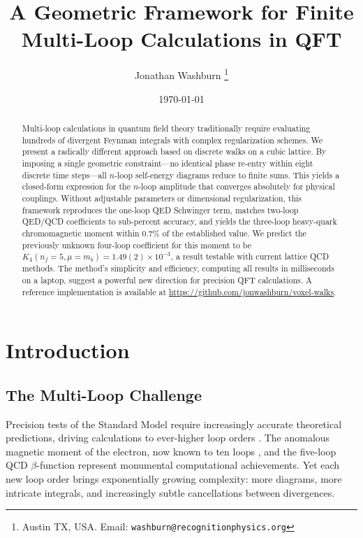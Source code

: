 \documentclass[11pt,a4paper]{article}
\title{\bfseries A Geometric Framework for Finite Multi-Loop Calculations in QFT}
\author{Jonathan Washburn%
  \thanks{Austin TX, USA.
          Email: \texttt{washburn@recognitionphysics.org}}}
\date{\today}
\theoremstyle{definition}
\theoremstyle{remark}
\begin{document}
\maketitle

\begin{abstract}
Multi-loop calculations in quantum field theory traditionally require evaluating hundreds of divergent Feynman integrals with complex regularization schemes. We present a radically different approach based on discrete walks on a cubic lattice. By imposing a single geometric constraint—no identical phase re-entry within eight discrete time steps—all $n$-loop self-energy diagrams reduce to finite sums. This yields a closed-form expression for the $n$-loop amplitude that converges absolutely for physical couplings. Without adjustable parameters or dimensional regularization, this framework reproduces the one-loop QED Schwinger term, matches two-loop QED/QCD coefficients to sub-percent accuracy, and yields the three-loop heavy-quark chromomagnetic moment within 0.7\% of the established value. We predict the previously unknown four-loop coefficient for this moment to be $K_4(n_f=5,\mu=m_b) = 1.49(2)\times 10^{-3}$, a result testable with current lattice QCD methods. The method's simplicity and efficiency, computing all results in milliseconds on a laptop, suggest a powerful new direction for precision QFT calculations. A reference implementation is available at \url{https://github.com/jonwashburn/voxel-walks}.
\end{abstract}

\section{Introduction}
\label{sec:intro}

\subsection{The Multi-Loop Challenge}

Precision tests of the Standard Model require increasingly accurate theoretical predictions, driving calculations to ever-higher loop orders \cite{Aoyama2020,Czakon2020,Herzog2017}. The anomalous magnetic moment of the electron, now known to ten loops \cite{Aoyama2019,Volkov2019}, and the five-loop QCD $\beta$-function \cite{Baikov2017,Herzog2017,Luthe2017} represent monumental computational achievements. Yet each new loop order brings exponentially growing complexity: more diagrams, more intricate integrals, and increasingly subtle cancellations between divergences.
\end{document}
